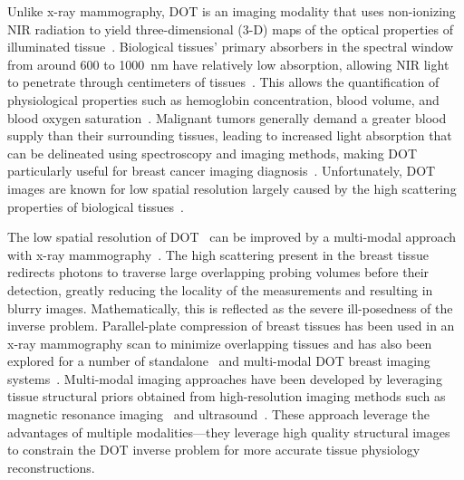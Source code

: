 Unlike x-ray mammography, \ac{DOT} is an imaging modality that uses non-ionizing \ac{NIR} radiation to yield three-dimensional (3-D) maps of the optical properties of illuminated tissue~\cite{Boas2001, Dehghani2009, Yamada2014, Hoshi2016}. Biological tissues' primary absorbers in the spectral window from around 600 to 1000~nm have relatively low absorption, allowing \ac{NIR} light to penetrate through centimeters of tissues~\cite{Gibson2005}. This allows the quantification of physiological properties such as hemoglobin concentration, blood volume, and blood oxygen saturation~\cite{Leff2008, Boas2001}. Malignant tumors generally demand a greater blood supply than their surrounding tissues, leading to increased light absorption that can be delineated using spectroscopy and imaging methods, making \ac{DOT} particularly useful for breast cancer imaging diagnosis~\cite{Wang2022, Vavadi2014, Flexman2013, Choe2009, Taroni2005}. Unfortunately, \ac{DOT} images are known for low spatial resolution largely caused by the high scattering properties of biological tissues~\cite{Boas2001}. 

The low spatial resolution of \ac{DOT}~\cite{Li2010} can be improved by a multi-modal approach with x-ray mammography~\cite{Zimmermann2017, Deng2015, Deng2015a, Fang2009a}. The high scattering present in the breast tissue redirects photons to traverse large overlapping probing volumes before their detection, greatly reducing the locality of the measurements and resulting in blurry images. Mathematically, this is reflected as the severe ill-posedness of the inverse problem. Parallel-plate compression of breast tissues has been used in an x-ray mammography scan to minimize overlapping tissues and has also been explored for a number of standalone~\cite{Choe2009, Culver2003} and multi-modal \ac{DOT} breast imaging systems~\cite{ZhuReview2020, Fang2009a, Krishnaswamy2012}. Multi-modal imaging approaches have been developed by leveraging tissue structural priors obtained from high-resolution imaging methods such as magnetic resonance imaging~\cite{Ghussein2013,Ntziachristos2002} and ultrasound~\cite{Zhu2010}. These approach leverage the advantages of multiple modalities---they leverage high quality structural images to constrain the \ac{DOT} inverse problem for more accurate tissue physiology reconstructions. 


